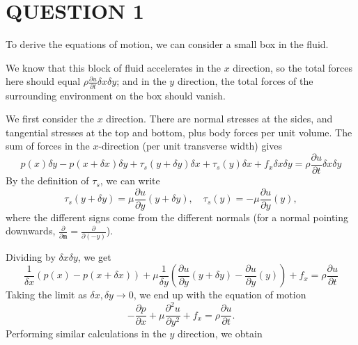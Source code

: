 \documentclass[a4paper]{article}
\begin{document}
	
\maketitle

\section{QUESTION 1}

To derive the equations of motion, we can consider a small box in the fluid.
\begin{center}
\end{center}

We know that this block of fluid accelerates in the $x$ direction, so the total forces here should equal $ \rho \frac{\partial u }{\partial t} \delta x \delta y $; and in the $ y $ direction, the total forces of the surrounding environment on the box should vanish.


We first consider the $x$ direction. There are normal stresses at the sides, and tangential stresses at the top and bottom, plus body forces per unit volume. The sum of forces in the $x$-direction (per unit transverse width) gives
\[
p(x) \delta y - p(x + \delta x) \delta y + \tau_s(y + \delta y) \delta x + \tau_s(y) \delta x  +  f_{x} \delta x \delta y = \rho \frac{\partial u }{\partial t} \delta x \delta y
\]
By the definition of $\tau_s$, we can write
\[
\tau_s(y + \delta y) = \mu \frac{\partial u}{\partial y}(y + \delta y),\quad \tau_s (y) = -\mu \frac{\partial u}{\partial y}(y),
\]
where the different signs come from the different normals (for a normal pointing downwards, $\frac{\partial}{\partial \mathbf{n}} = \frac{\partial}{\partial(-y)}$).

Dividing by $\delta x \delta y$, we get
\[
\frac{1}{\delta x}(p(x) - p(x + \delta x)) + \mu\frac{1}{\delta y}\left(\frac{\partial u}{\partial y}(y + \delta y) - \frac{\partial u}{\partial y}(y)\right) + f_{x} = \rho \frac{\partial u }{\partial t}
\]
Taking the limit as $\delta x, \delta y \to 0$, we end up with the equation of motion
\[
-\frac{\partial p}{\partial x} + \mu \frac{\partial^2 u}{\partial y^2} + f_{x} = \rho \frac{\partial u }{\partial t}.
\]
Performing similar calculations in the $y$ direction, we obtain
\end{document}
